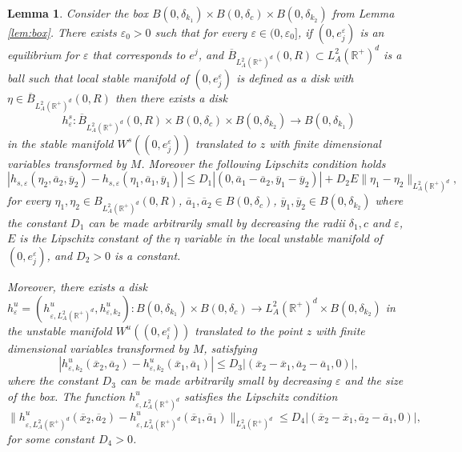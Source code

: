 \documentclass[11pt, leqno]{amsart}
\newtheorem{lem}[thm]{Lemma}
\theoremstyle{definition}
\def\R{\mathbb{R}}
\begin{document}
\begin{lem}\label{lem:boxeps}
Consider the box $B(0,\delta_{k_1}) \times B(0,\delta_c)\times B(0,\delta_{k_2})$ from Lemma \ref{lem:box}. There exists $\varepsilon_0>0$ such that for every $\varepsilon \in (0,\varepsilon_0]$, if  $(0,e_j^\varepsilon)$ is an equilibrium for $\varepsilon$ that corresponds to $e^j$, and  $\overline{B}_{L^2_A( \R^+)^d}(0,R)\subset L^2_A( \R^+)^d$ is a ball such that local stable manifold of $(0,e_j^\varepsilon)$ is defined as a disk with $\eta \in \overline{B}_{L^2_A( \R^+)^d}(0,R)$ then there exists a disk 
$$
h^s_{\varepsilon}:\overline{B}_{L^2_A( \R^+)^d}(0,R) \times B(0,\delta_c)\times B(0,\delta_{k_2}) \to  B(0,\delta_{k_1}) 
$$
in the stable manifold $W^s((0,e_j^\varepsilon))$ translated to $z$ with finite dimensional variables transformed by $M$. Moreover the following Lipschitz condition holds
$$
|h_{s,\varepsilon}(\eta_2,\overline{a}_2,\overline{y}_2) - h_{s,\varepsilon}(\eta_1,\overline{a}_1,\overline{y}_1)|\leq D_1 |(0,\overline{a}_1-\overline{a}_2,\overline{y}_1-\overline{y}_2) | + D_2E\|\eta_1-\eta_2\|_{L^2_A( \R^+)^d},
$$
  for every $\eta_1, \eta_2 \in B_{L^2_A( \R^+)^d}(0,R)$, $\overline{a}_1, \overline{a}_2 \in B(0,\delta_c)$, $\overline{y}_1, \overline{y}_2 \in B(0,\delta_{k_2})$ where the constant $D_1$ can be made arbitrarily small by decreasing the radii $\delta_1, c$  and $\varepsilon$,  $E$ is the Lipschitz constant of the $\eta$ variable in the local unstable manifold of  $(0,e_j^\varepsilon)$, and $D_2>0$ is a constant.

  Moreover, there exists a disk $h^u_{\varepsilon}=(h^u_{\varepsilon,L^2_A(\R^+)^d},h^u_{\varepsilon,k_2}):B(0,\delta_{k_1}) \times B(0,\delta_c) \to L^2_A(\R^+)^d \times B(0,\delta_{k_2}) $ in the unstable manifold $W^u((0,e_i^\varepsilon))$ translated to the point $z$ with finite dimensional variables transformed by $M$,  satisfying
  $$
  |h^u_{\varepsilon,k_2}(\overline{x}_2,\overline{a}_2) - h^u_{\varepsilon,k_2}(\overline{x}_1,\overline{a}_1)|\leq D_3 |(\overline{x}_2-\overline{x}_1,\overline{a}_2-\overline{a}_1,0)|,
  $$
  where the constant $D_3$ can be made arbitrarily small by decreasing $\varepsilon$ and the size of the box. The function $h^u_{\varepsilon,L^2_A(\R^+)^d}$ satisfies the Lipschitz condition
  $$
  \|h^u_{\varepsilon,L^2_A(\R^+)^d}(\overline{x}_2,\overline{a}_2) - h^u_{\varepsilon,L^2_A(\R^+)^d}(\overline{x}_1,\overline{a}_1)\|_{L^2_A( \R^+)^d}\leq D_4 |(\overline{x}_2-\overline{x}_1,\overline{a}_2-\overline{a}_1,0)|,
  $$
  for some constant $D_4>0$.
\end{lem}			
\end{document}

